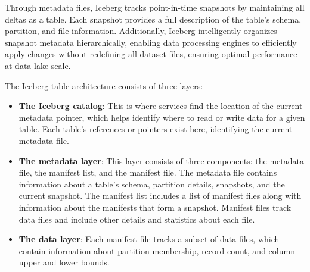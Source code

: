 Through metadata files, Iceberg tracks point-in-time snapshots by maintaining all deltas as a table. Each snapshot provides a full description of the table's schema, partition, and file information. Additionally, Iceberg intelligently organizes snapshot metadata hierarchically, enabling data processing engines to efficiently apply changes without redefining all dataset files, ensuring optimal performance at data lake scale.

The Iceberg table architecture consists of three layers:

\begin{itemize}
    \item \textbf{The Iceberg catalog}: This is where services find the location of the current metadata pointer, which helps identify where to read or write data for a given table. Each table's references or pointers exist here, identifying the current metadata file.
    \item \textbf{The metadata layer}: This layer consists of three components: the metadata file, the manifest list, and the manifest file. The metadata file contains information about a table's schema, partition details, snapshots, and the current snapshot. The manifest list includes a list of manifest files along with information about the manifests that form a snapshot. Manifest files track data files and include other details and statistics about each file.
    \item \textbf{The data layer}: Each manifest file tracks a subset of data files, which contain information about partition membership, record count, and column upper and lower bounds.
\end{itemize}